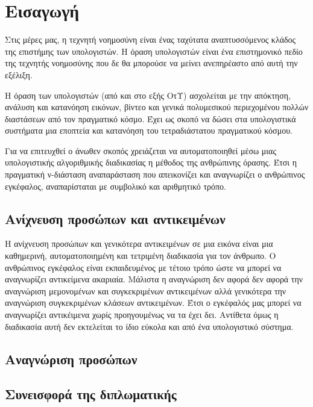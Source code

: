 \chapter{Εισαγωγή}\label{ch:introduction}

Στις μέρες μας, η τεχνητή νοημοσύνη είναι ένας ταχύτατα αναπτυσσόμενος κλάδος
της επιστήμης των υπολογιστών. Η όραση υπολογιστών είναι ένα επιστημονικό πεδίο
της τεχνητής νοημοσύνης που δε θα μπορούσε να μείνει ανεπηρέαστο από αυτή την
εξέλιξη.

Η όραση των υπολογιστών (από και στο εξής ΟτΥ) ασχολείται με την απόκτηση,
ανάλυση και κατανόηση εικόνων, βίντεο και γενικά πολυμεσικού περιεχομένου
πολλών διαστάσεων από τον πραγματικό κόσμο. Έχει ως σκοπό να δώσει στα
υπολογιστικά συστήματα μια εποπτεία και κατανόηση του τετραδιάστατου
πραγματικού κόσμου.

Για να επιτευχθεί ο άνωθεν σκοπός χρειάζεται να αυτοματοποιηθεί μέσω μιας
υπολογιστικής αλγοριθμικής διαδικασίας η μέθοδος της ανθρώπινης όρασης. Έτσι
η πραγματική ν-διάσταση αναπαράσταση που απεικονίζει και αναγνωρίζει ο
ανθρώπινος εγκέφαλος, αναπαρίσταται με συμβολικό και αριθμητικό τρόπο.

\section{Ανίχνευση προσώπων και αντικειμένων}
Η ανίχνευση προσώπων και γενικότερα αντικειμένων σε μια εικόνα είναι μια
καθημερινή, αυτοματοποιημένη και τετριμένη διαδικασία για τον άνθρωπο. Ο ανθρώπινος
εγκέφαλος είναι εκπαιδευμένος με τέτοιο τρόπο ώστε να μπορεί να αναγνωρίζει
αντικείμενα ακαριαία. Μάλιστα η αναγνώριση δεν αφορά δεν αφορά την αναγνώριση
μεμονομένων και συγκεκριμένων αντικειμένων αλλά γενικότερα την αναγνώριση
συγκεκριμένων κλάσεων αντικειμένων. Έτσι ο εγκέφαλός μας μπορεί να αναγνωρίζει
αντικέιμενα χωρίς προηγουμένως να τα έχει δει. Αντίθετα όμως η διαδικασία αυτή
δεν εκτελείται το ίδιο εύκολα και από ένα υπολογιστικό σύστημα.


\section{Αναγνώριση προσώπων}

\section{Συνεισφορά της διπλωματικής}

